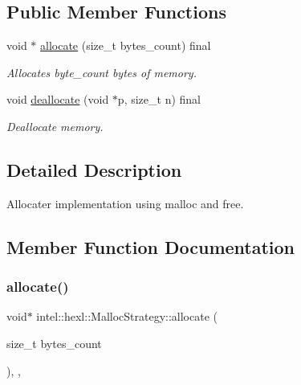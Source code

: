 \subsection*{Public Member Functions}
\begin{DoxyCompactItemize}
\item 
void $\ast$ \hyperlink{structintel_1_1hexl_1_1MallocStrategy_a010052a3f5e39991d57a38742d853738}{allocate} (size\+\_\+t bytes\+\_\+count) final
\begin{DoxyCompactList}\small\item\em Allocates byte\+\_\+count bytes of memory. \end{DoxyCompactList}\item 
void \hyperlink{structintel_1_1hexl_1_1MallocStrategy_af45ff5d0c9b1e867fac481f447a4569c}{deallocate} (void $\ast$p, size\+\_\+t n) final
\begin{DoxyCompactList}\small\item\em Deallocate memory. \end{DoxyCompactList}\end{DoxyCompactItemize}


\subsection{Detailed Description}
Allocater implementation using malloc and free. 

\subsection{Member Function Documentation}
\mbox{\label{structintel_1_1hexl_1_1MallocStrategy_a010052a3f5e39991d57a38742d853738}} 
\subsubsection{\texorpdfstring{allocate()}{allocate()}}
{\footnotesize\ttfamily void$\ast$ intel\+::hexl\+::\+Malloc\+Strategy\+::allocate (\begin{DoxyParamCaption}\item[{size\+\_\+t}]{bytes\+\_\+count }\end{DoxyParamCaption})\hspace{0.3cm}{\ttfamily [inline]}, {\ttfamily [final]}, {\ttfamily [virtual]}}



